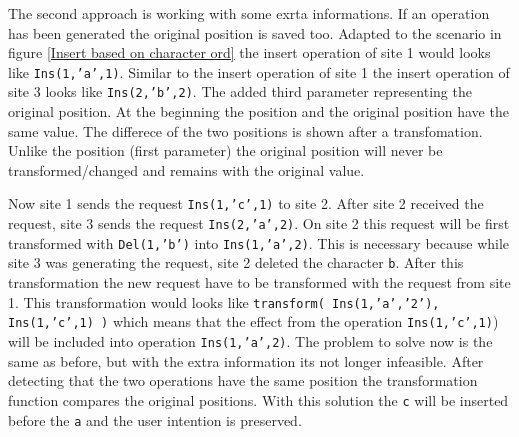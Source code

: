 \begin{itemize}
The second approach is working with some exrta informations. If an operation has been generated the original position is saved too. Adapted to the scenario in figure \ref{Insert based on character ord} the insert operation of site 1 would looks like \texttt{Ins(1,'a',1)}. Similar to the insert operation of site 1 the insert operation of site 3 looks like \texttt{Ins(2,'b',2)}. The added third parameter representing the original position. At the beginning the position and the original position have the same value. The differece of the two positions is shown after a transfomation. Unlike the position (first parameter) the original position will never be transformed/changed and remains with the original value.

Now site 1 sends the request \texttt{Ins(1,'c',1)} to site 2. After site 2 received the request, site 3 sends the request \texttt{Ins(2,'a',2)}. On site 2 this request will be first transformed with \texttt{Del(1,'b')} into \texttt{Ins(1,'a',2)}. This is necessary because while site 3 was generating the request, site 2 deleted the character \texttt{b}. After this transformation the new request have to be transformed with the request from site 1. This transformation would looks like \texttt{transform( Ins(1,'a','2'), Ins(1,'c',1) )} which means that the effect from the operation \texttt{Ins(1,'c',1)}) will be included into operation \texttt{Ins(1,'a',2)}. The problem to solve now is the same as before, but with the extra information its not longer infeasible. After detecting that the two operations have the same position the transformation function compares the original positions. With this solution the \texttt{c} will be inserted before the \texttt{a} and the user intention is preserved.


\end{itemize}
